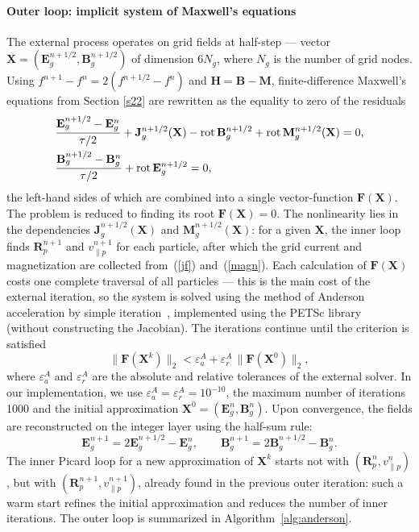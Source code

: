 \documentclass[final,3p]{elsarticle}
\newcommand{\rot}{\mbox{\rm{rot\,}}}
\begin{document}
\paragraph{Outer loop: implicit system of Maxwell's equations}
The external process operates on grid fields at half-step --- vector $\mathbf{X}=(\mathbf{E}_g^{n+1/2},\mathbf{B}_g^{n+1/2})$ of dimension $6N_g$, where $N_g$ is the number of grid nodes. Using $f^{n+1}-f^n=2(f^{n+1/2}-f^n)$ and $\mathbf{H}=\mathbf{B}-\mathbf{M}$, finite-difference Maxwell's equations from Section \ref{s22} are rewritten as the equality to zero of the residuals 
\begin{align}
    &\frac{\mathbf{E}_g^{n+1/2}-\mathbf{E}_g^n}{\tau/2}+\mathbf{J}_g^{n+1/2}(\mathbf{X})-\rot\mathbf{B}_g^{n+1/2}+\rot\mathbf{M}_g^{n+1/2}(\mathbf{X})=0, \label{mx_FE}\\
    &\frac{\mathbf{B}_g^{n+1/2}-\mathbf{B}_g^n}{\tau/2}+\rot\mathbf{E}_g^{n+1/2}=0, \label{mx_FB}
\end{align}
the left-hand sides of which are combined into a single vector-function $\mathbf{F}(\mathbf{X})$. The problem is reduced to finding its root $\mathbf{F}(\mathbf{X})=0$. The nonlinearity lies in the dependencies $\mathbf{J}_g^{n+1/2}(\mathbf{X})$ and $\mathbf{M}_g^{n+1/2}(\mathbf{X})$: for a given $\mathbf{X}$, the inner loop finds $\mathbf{R}_p^{n+1}$ and $v_{\|p}^{n+1}$ for each particle, after which the grid current and magnetization are collected from~(\ref{jf}) and~(\ref{magn}). Each calculation of $\mathbf{F}(\mathbf{X})$ costs one complete traversal of all particles --- this is the main cost of the external iteration, so the system is solved using the method of Anderson acceleration by simple iteration~\cite{Anderson1965}, implemented using the PETSc library~\cite{petsc} (without constructing the Jacobian). The iterations continue until the criterion is satisfied
\begin{equation}\label{mx_crit}
    \|\mathbf{F}(\mathbf{X}^k)\|_2 < \varepsilon_a^{A} + \varepsilon_r^{A}\,\|\mathbf{F}(\mathbf{X}^0)\|_2,
\end{equation}
where $\varepsilon_a^{A}$ and $\varepsilon_r^{A}$ are the absolute and relative tolerances of the external solver. In our implementation, we use $\varepsilon_a^{A}=\varepsilon_r^{A}=10^{-10}$, the maximum number of iterations 1000 and the initial approximation $\mathbf{X}^0=(\mathbf{E}_g^n,\mathbf{B}_g^n)$. Upon convergence, the fields are reconstructed on the integer layer using the half-sum rule:
\begin{equation}\label{mx_step} 
    \mathbf{E}_g^{n+1}=2\mathbf{E}_g^{n+1/2}-\mathbf{E}_g^n,\qquad \mathbf{B}_g^{n+1}=2\mathbf{B}_g^{n+1/2}-\mathbf{B}_g^n .
\end{equation}
The inner Picard loop for a new approximation of $\mathbf{X}^k$ starts not with $(\mathbf{R}_p^n,v_{\|p}^n)$, but with $(\mathbf{R}_p^{n+1},v_{\|p}^{n+1})$, already found in the previous outer iteration: such a warm start refines the initial approximation and reduces the number of inner iterations. The outer loop is summarized in Algorithm~\ref{alg:anderson}.
 
\end{document}
